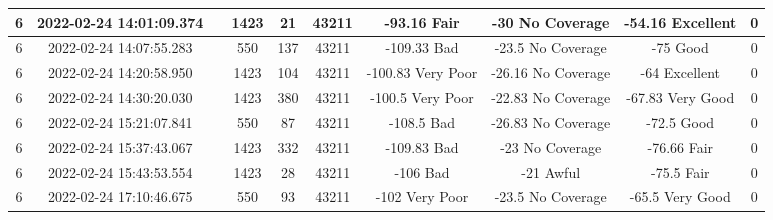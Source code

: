 \begin{longtable*}{|c|c|c|c|c|c|c|c|c|c|}
6&2022-02-24 14:01:09.374&&1423&21&43211& -93.16    Fair        & -30       No Coverage & -54.16    Excellent   & 0\\\hline
{}6&2022-02-24 14:07:55.283&&550&137&43211& -109.33   Bad         & -23.5     No Coverage & -75       Good        & 0\\\hline
{}6&2022-02-24 14:20:58.950&&1423&104&43211& -100.83   Very Poor   & -26.16    No Coverage & -64       Excellent   & 0\\\hline
{}6&2022-02-24 14:30:20.030&&1423&380&43211& -100.5    Very Poor   & -22.83    No Coverage & -67.83    Very Good   & 0\\\hline
{}6&2022-02-24 15:21:07.841&&550&87&43211& -108.5    Bad         & -26.83    No Coverage & -72.5     Good        & 0\\\hline
{}6&2022-02-24 15:37:43.067&&1423&332&43211& -109.83   Bad         & -23       No Coverage & -76.66    Fair        & 0\\\hline
{}6&2022-02-24 15:43:53.554&&1423&28&43211& -106      Bad         & -21       Awful       & -75.5     Fair        & 0\\\hline
{}6&2022-02-24 17:10:46.675&&550&93&43211& -102      Very Poor   & -23.5     No Coverage & -65.5     Very Good   & 0\\\hline

\end{longtable*}
